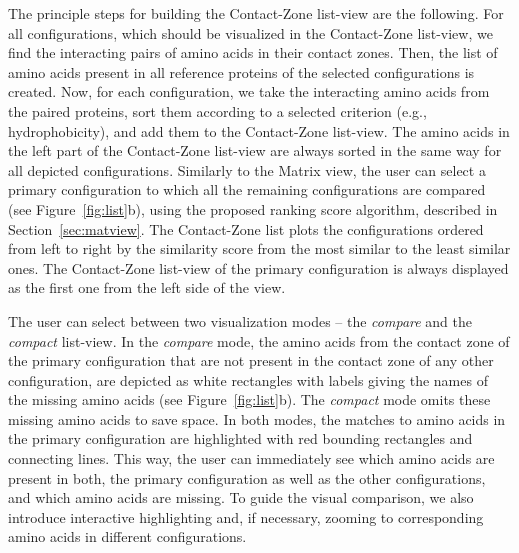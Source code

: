 \documentclass{bmcart}
\def\MatView {Matrix view\xspace}
\def\CoZoListView {Contact-Zone list-view\xspace}
\def\CoZoList{Contact-Zone list\xspace}
\begin{document}
The principle steps for building the \CoZoListView are the following.
For all configurations, which should be visualized in the \CoZoListView, we find the interacting pairs of amino acids in their contact zones.
Then, the list of amino acids present in all reference proteins of the selected configurations is created.
Now, for each configuration, we take the interacting amino acids from the paired proteins, sort them according to a selected criterion (e.g., hydrophobicity), and add them to the \CoZoListView.
The amino acids in the left part of the \CoZoListView are always sorted in the same way for all depicted configurations.
Similarly to the \MatView, the user can select a primary configuration to which all the remaining configurations are compared (see Figure~\ref{fig:list}b), using the proposed ranking score algorithm, described in Section~\ref{sec:matview}.
The \CoZoList plots the configurations ordered from left to right by the similarity score from the most similar to the least similar ones.
The \CoZoListView of the primary configuration is always displayed as the first one from the left side of the view.

The user can select between two visualization modes -- the \textit{compare} and the \textit{compact} list-view.
In the \textit{compare} mode, the amino acids from the contact zone of the primary configuration that are not present in the contact zone of any other configuration, are depicted as white rectangles with labels giving the names of the missing amino acids (see Figure~\ref{fig:list}b).
The \textit{compact} mode omits these missing amino acids to save space.
In both modes, the matches to amino acids in the primary configuration are highlighted with red bounding rectangles and connecting lines.
This way, the user can immediately see which amino acids are present in both, the primary configuration as well as the other configurations, and which amino acids are missing.
To guide the visual comparison, we also introduce interactive highlighting and, if necessary, zooming to corresponding amino acids in different configurations.

\end{document}
